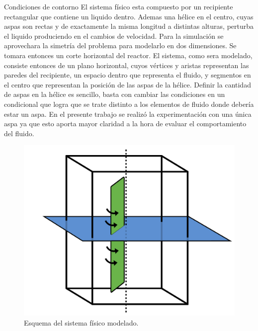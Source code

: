

\begin{section}{Condiciones de contorno}
El sistema físico esta compuesto por un recipiente rectangular que contiene un liquido dentro. Ademas una hélice en el centro, cuyas aspas son rectas y de exactamente la misma longitud a distintas alturas, perturba el liquido produciendo en el cambios de velocidad. 
Para la simulación se aprovechara la simetría del problema para modelarlo en dos dimensiones. Se tomara entonces un corte horizontal del reactor. El sistema, como sera modelado, consiste entonces de un plano horizontal, cuyos vértices y aristas representan las paredes del recipiente, un espacio dentro que representa el fluido, y segmentos en el centro que representan la posición de las aspas de la hélice. Definir la cantidad de aspas en la hélice es sencillo, basta con cambiar las condiciones en un condicional que logra que se trate distinto a los elementos de fluido donde debería estar un aspa. En el presente trabajo se realizó la experimentación con una única aspa ya que esto aporta mayor claridad a la hora de evaluar el comportamiento del fluido.
~\\


\begin{figure}[h]
\includegraphics[width=\textwidth/2,height=\textheight/2,keepaspectratio]{figures/reactor}
\caption{Esquema del sistema físico modelado.}
\label{fig:border}

\end{figure}


\end{section}
